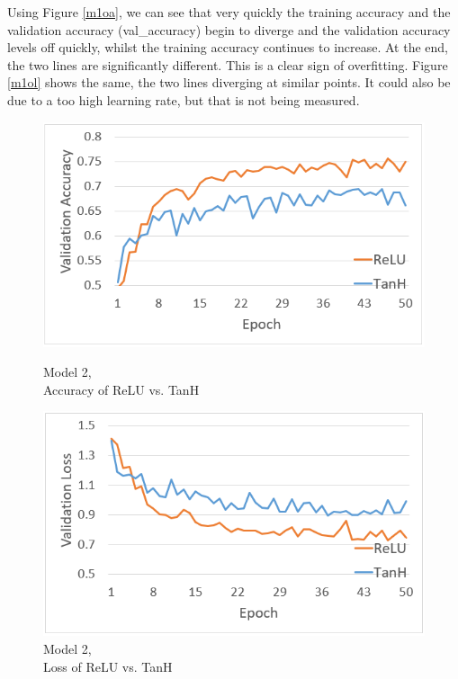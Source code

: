 \documentclass[a4paper, 11pt]{article}
\begin{document}
Using Figure \ref{m1oa}, we can see that very quickly the training accuracy and the validation accuracy (val\_accuracy) begin to diverge and the validation accuracy levels off quickly, whilst the training accuracy continues to increase. At the end, the two lines are significantly different. This is a clear sign of overfitting. Figure \ref{m1ol} shows the same, the two lines diverging at similar points. It could also be due to a too high learning rate, but that is not being measured.

\begin{figure}[h]
\begin{minipage}{0.45\textwidth}
\captionsetup{justification=centering}
\centering
\includegraphics[scale=0.45]{2relucomp}
\caption[caption]{Model 2, \\ Accuracy of ReLU vs. TanH}
\label{m2a}
\end{minipage}
\begin{minipage}{0.45\textwidth}
\captionsetup{justification=centering}
\centering
\includegraphics[scale=0.45]{2relucomploss}
\caption{Model 2,\\ Loss of ReLU vs. TanH}
\label{m2l}
\end{minipage}
\end{figure}
\end{document}
